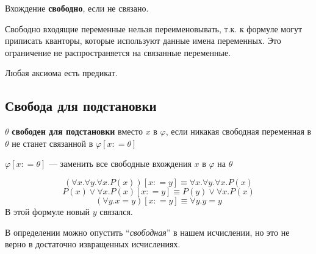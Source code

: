 \begin{definition}
    Вхождение \textbf{свободно}, если не связано.
\end{definition}

\begin{remark}
    Свободно входящие переменные нельзя переименовывать, т.к. к формуле могут приписать кванторы, которые используют данные имена переменных. Это ограничение не распространяется на связанные переменные.
\end{remark}

Любая аксиома есть предикат.

\subsection{Свобода для подстановки}

\begin{definition}
    \(\theta\) \textbf{свободен для подстановки} вместо \(x\) в \(\varphi\), если никакая свободная переменная в \(\theta\) не станет связанной в \(\varphi[x: = \theta]\)
\end{definition}

\begin{notation}
    \(\varphi[x: = \theta]\) --- заменить все свободные вхождения \(x\) в \(\varphi\) на \(\theta\)
\end{notation}

\begin{example}
    \[(\forall x.\forall y.\forall x.P(x))[x: = y] \equiv \forall x.\forall y.\forall x.P(x)\]
    \[P(x)\lor \forall x.P(x)[x: = y] \equiv P(y)\lor \forall x.P(x)\]
    \[(\forall y.x = y)[x: = y] \equiv \forall y.y = y\]
    В этой формуле новый \(y\) связался.
\end{example}

\begin{remark}
    В определении можно опустить ``\textit{свободная}'' в нашем исчислении, но это не верно в достаточно извращенных исчислениях.
\end{remark}

